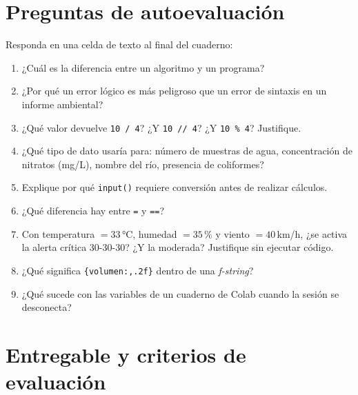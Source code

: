 \documentclass[11pt,a4paper]{article}
\newcommand{\code}[1]{\texttt{#1}}
\begin{document}
\section{Preguntas de autoevaluación}
Responda en una celda de texto al final del cuaderno:

\begin{enumerate}
  \item ¿Cuál es la diferencia entre un algoritmo y un programa?
  \item ¿Por qué un error lógico es más peligroso que un error de sintaxis en un informe ambiental?
  \item ¿Qué valor devuelve \code{10 / 4}? ¿Y \code{10 // 4}? ¿Y \code{10 \% 4}? Justifique.
  \item ¿Qué tipo de dato usaría para: número de muestras de agua, concentración de nitratos (mg/L), nombre del río, presencia de coliformes?
  \item Explique por qué \code{input()} requiere conversión antes de realizar cálculos.
  \item ¿Qué diferencia hay entre \code{=} y \code{==}?
  \item Con temperatura $= 33$\,°C, humedad $= 35$\,\% y viento $= 40$\,km/h, ¿se activa la alerta crítica 30-30-30? ¿Y la moderada? Justifique sin ejecutar código.
  \item ¿Qué significa \code{\{volumen:,.2f\}} dentro de una \emph{f-string}?
  \item ¿Qué sucede con las variables de un cuaderno de Colab cuando la sesión se desconecta?
\end{enumerate}

\section{Entregable y criterios de evaluación}
\end{document}
